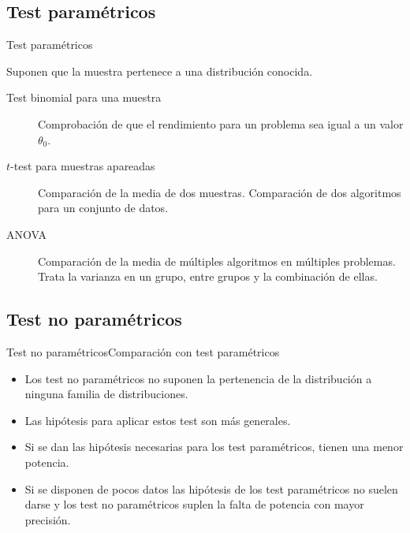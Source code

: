 \documentclass[leqno]{beamer}
\theoremstyle{definition_wo_parentheses}
\begin{document}
\subsection{Test paramétricos}
\begin{frame}{Test paramétricos}

	Suponen que la muestra pertenece a una distribución conocida. 

\begin{description}
\item[Test binomial para una muestra] Comprobación de que 
	el rendimiento para un problema sea igual a un valor 
	$\theta_0$.
\item[$t$-test para muestras apareadas]  Comparación de la 
	media de dos muestras. Comparación de dos algoritmos
	para un conjunto de datos.
\item[ANOVA] Comparación de la media de múltiples algoritmos
	en múltiples problemas. Trata la varianza
	en un grupo, entre grupos y la combinación de ellas.
\end{description}
\end{frame}



\subsection{Test no paramétricos}

\begin{frame}{Test no paramétricos}{Comparación con test paramétricos}
\begin{itemize}
\item Los test no paramétricos no suponen la pertenencia 
	de la distribución a ninguna familia de distribuciones.
\item Las hipótesis para aplicar estos test son más
	generales. 
\item Si se dan las hipótesis necesarias para los test
	paramétricos, tienen una menor potencia.
\item Si se disponen de pocos datos las hipótesis de los
	test paramétricos no suelen darse y los test no
	paramétricos suplen la falta de potencia con mayor
	precisión.
\end{itemize}		
\end{frame}
\end{document}
